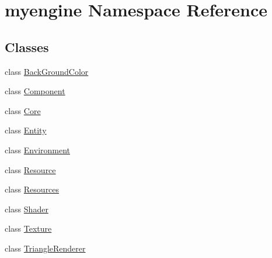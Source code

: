 \hypertarget{namespacemyengine}{}\section{myengine Namespace Reference}
\label{namespacemyengine}
\subsection*{Classes}
\begin{DoxyCompactItemize}
\item 
class \hyperlink{classmyengine_1_1_back_ground_color}{Back\+Ground\+Color}
\item 
class \hyperlink{classmyengine_1_1_component}{Component}
\item 
class \hyperlink{classmyengine_1_1_core}{Core}
\item 
class \hyperlink{classmyengine_1_1_entity}{Entity}
\item 
class \hyperlink{classmyengine_1_1_environment}{Environment}
\item 
class \hyperlink{classmyengine_1_1_resource}{Resource}
\item 
class \hyperlink{classmyengine_1_1_resources}{Resources}
\item 
class \hyperlink{classmyengine_1_1_shader}{Shader}
\item 
class \hyperlink{classmyengine_1_1_texture}{Texture}
\item 
class \hyperlink{classmyengine_1_1_triangle_renderer}{Triangle\+Renderer}
\end{DoxyCompactItemize}
